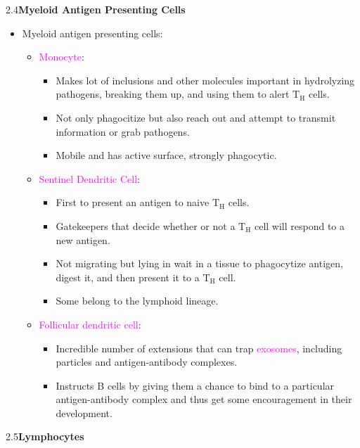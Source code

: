 \documentclass[UTF8]{book}
\newcommand{\concept}[1]{\textcolor{magenta}{#1}}
\begin{document}
2.4\quad \textbf{Myeloid Antigen Presenting Cells}
\begin{itemize}
\item Myeloid antigen presenting cells:
\begin{itemize}
	\item \concept{Monocyte}:
	\begin{itemize}
		\item Makes lot of inclusions and other molecules important in hydrolyzing pathogens, breaking them up, and using them to alert $\mathrm{T_H}$ cells.
		\item Not only phagocitize but also reach out and attempt to transmit information or grab pathogens.
		\item Mobile and has active surface, strongly phagocytic.
	\end{itemize}
	\item \concept{Sentinel Dendritic Cell}:
	\begin{itemize}
		\item First to present an antigen to naive $\mathrm{T_H}$ cells.
		\item Gatekeepers that decide whether or not a $\mathrm{T_H}$ cell will respond to a new antigen.
		\item Not migrating but lying in wait in a tissue to phagocytize antigen, digest it, and then present it to a $\mathrm{T_H}$ cell.
		\item Some belong to the lymphoid lineage.
	\end{itemize}
	\item \concept{Follicular dendritic cell}:
	\begin{itemize}
		\item Incredible number of extensions that can trap \concept{exosomes}, including particles and antigen-antibody complexes.
		\item Instructs B cells by giving them a chance to bind to a particular antigen-antibody complex and thus get some encouragement in their development.
	\end{itemize}
\end{itemize}
\end{itemize}
2.5\quad \textbf{Lymphocytes}
\end{document}
